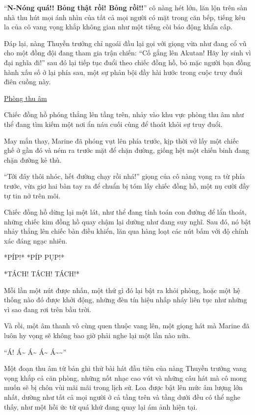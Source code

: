 \documentclass[../main.tex]{subfiles}
\begin{document}
``\textbf{N-Nóng quá!! Bỏng thật rồi! Bỏng rồi!!}'' cô nàng hét lớn, lăn lộn trên sàn nhà thu hút mọi ánh nhìn của tất cả mọi người có mặt trong căn bếp, tiếng kêu la của cô vang vọng khắp không gian như một tiếng còi báo động khẩn cấp.

Đáp lại, nàng Thuyền trưởng chỉ ngoái đầu lại gọi với giọng vừa như đang cổ vũ cho một đồng đội đang tham gia trận chiến: ``Cố gắng lên Akutan! Hãy hy sinh vì đại nghĩa đi!'' sau đó lại tiếp tục đuổi theo chiếc đồng hồ, bỏ mặc người bạn đồng hành xấu số ở lại phía sau, một sự phản bội đầy hài hước trong cuộc truy đuổi điên cuồng này.

\begin{center}
  \uline{Phòng thu âm}
\end{center}

Chiếc đồng hồ phóng thẳng lên tầng trên, nhảy vào khu vực phòng thu âm như thể đang tìm kiếm một nơi ẩn náu cuối cùng để thoát khỏi sự truy đuổi.

May mắn thay, Marine đã phóng vụt lên phía trước, kịp thời vớ lấy một chiếc ghế ở gần đó và ném ra trước mặt để chặn đường, giống hệt một chiến binh đang chặn đường kẻ thù.

``Tới đây thôi nhóc, hết đường chạy rồi nhá!'' giọng của cô nàng vọng ra từ phía trước, vừa giơ hai bàn tay ra để chuẩn bị tóm lấy chiếc đồng hồ, một nụ cười đầy tự tin nở trên môi.

Chiếc đồng hồ dừng lại một lát, như thể đang tính toán con đường để lẩn thoát, những chiếc kim đồng hồ quay chậm lại dường như đang suy nghĩ. Sau đó, nó bật nhảy thẳng lên chiếc bàn điều khiển, lăn qua hàng loạt các nút bấm với độ chính xác đáng ngạc nhiên.

*PÍP!* *PÍP PỤP!*

*TÁCH! TÁCH! TÁCH!*

Mỗi lần một nút được nhấn, một thứ gì đó lại bật ra khỏi phòng, hoặc một hệ thống nào đó được khởi động, những đèn tín hiệu nhấp nháy liên tục như những vì sao đang rơi trên bầu trời.

Và rồi, một âm thanh vô cùng quen thuộc vang lên, một giọng hát mà Marine đã luôn hy vọng sẽ không bao giờ phải nghe lại một lần nào nữa.

``Á! Á\~{} Á\~{} Á\~{} Á\~{}\~{}''

Một đoạn thu âm từ bản ghi thử bài hát đầu tiên của nàng Thuyền trưởng vang vọng khắp cả căn phòng, những nốt nhạc cao vút và những câu hát mà cô mong muốn sẽ bị chôn vùi mãi mãi trong lịch sử. Loa được bật lên mức âm lượng lớn nhất, dường như tất cả mọi người ở cả tầng trên và tầng dưới đều có thể nghe thấy, như một hồi ức từ quá khứ đang quay lại ám ảnh hiện tại.
\end{document}
